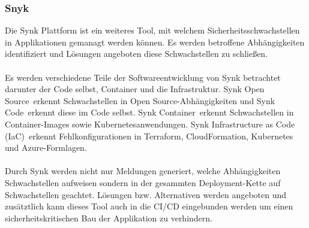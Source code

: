 \subsubsection{Snyk} \label{sec:Snyk}
Die Synk Plattform ist ein weiteres Tool, mit welchem Sicherheitsschwachstellen in Applikationen gemanagt werden können.
Es werden betroffene Abhängigkeiten identifiziert und Lösungen angeboten diese Schwachstellen zu schließen.
\\ \\
Es werden verschiedene Teile der Softwareentwicklung von Synk betrachtet darunter der Code selbst, Container und die Infrastruktur.
\glqq Synk Open Source\grqq~erkennt Schwachstellen in \glqq Open Source\grqq-Abhängigkeiten und \glqq Synk Code\grqq~erkennt diese im Code selbst.
\glqq Synk Container\grqq~erkennt Schwachstellen in Container-Images sowie Kubernetesanwendungen.
\glqq Synk Infrastructure as Code (IaC)\grqq~erkennt Fehlkonfigurationen in Terraform, CloudFormation, Kubernetes und Azure-Formlagen.
\\ \\
Durch Synk werden nicht nur Meldungen generiert, welche Abhängigkeiten Schwachstellen aufweisen sondern in der gesammten Deployment-Kette auf Schwachstellen geachtet.
Lösungen bzw. Alternativen werden angeboten und zusätztlich kann dieses Tool auch in die CI/CD eingebunden werden um einen sicherheitskritischen Bau der Applikation zu verhindern.   